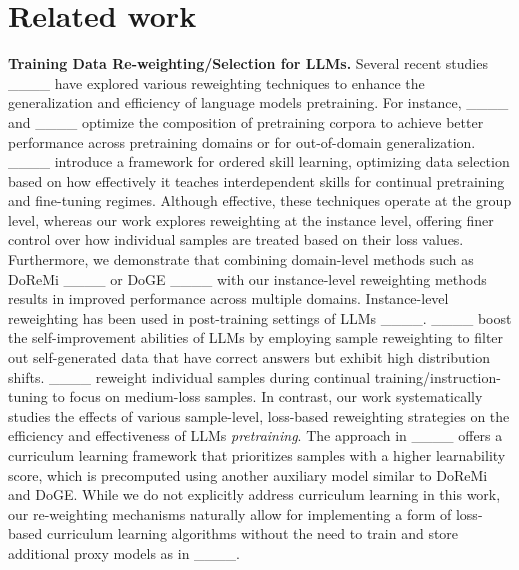 \section{Related work}
\vspace{-3mm}
\textbf{Training Data Re-weighting/Selection for LLMs.}
Several recent studies ____ have explored various reweighting techniques to enhance the generalization and efficiency of language models pretraining. For instance, ____ and ____ optimize the composition of pretraining corpora to achieve better performance across pretraining domains or for out-of-domain generalization. ____ introduce a framework for ordered skill learning, optimizing data selection based on how effectively it teaches interdependent skills for continual pretraining and fine-tuning regimes. Although effective, these techniques operate at the group level, whereas our work explores reweighting at the instance level, offering finer control over how individual samples are treated based on their loss values. Furthermore, we demonstrate that combining domain-level methods such as DoReMi ____ or DoGE ____ with our instance-level reweighting methods results in improved performance across multiple domains.
Instance-level reweighting has been used in post-training settings of LLMs ____. ____ boost the self-improvement abilities of LLMs by employing sample reweighting to filter out self-generated data that have correct answers but exhibit high distribution shifts. ____ reweight individual samples during continual training/instruction-tuning to focus on medium-loss samples. In contrast, our work systematically studies the effects of various sample-level, loss-based reweighting strategies on the efficiency and effectiveness of LLMs \emph{pretraining}.
The approach in ____ offers a curriculum learning framework that prioritizes samples with a higher learnability score, which is precomputed using another auxiliary model similar to DoReMi and DoGE. While we do not explicitly address curriculum learning in this work, our re-weighting mechanisms naturally allow for implementing a form of loss-based curriculum learning algorithms without the need to train and store additional proxy models as in ____. 

